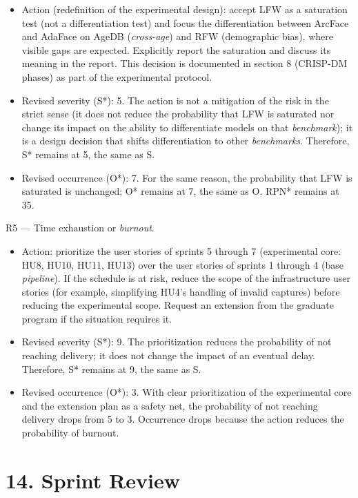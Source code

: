 \documentclass[
  11pt, %
]{charter}
\begin{document}
\begin{itemize}
\item Action (redefinition of the experimental design): accept LFW as a saturation test (not a differentiation test) and focus the differentiation between ArcFace and AdaFace on AgeDB (\textit{cross-age}) and RFW (demographic bias), where visible gaps are expected. Explicitly report the saturation and discuss its meaning in the report. This decision is documented in section 8 (CRISP-DM phases) as part of the experimental protocol.
\item Revised severity (S*): 5. The action is not a mitigation of the risk in the strict sense (it does not reduce the probability that LFW is saturated nor change its impact on the ability to differentiate models on that \textit{benchmark}); it is a design decision that shifts differentiation to other \textit{benchmarks}. Therefore, S* remains at 5, the same as S.
\item Revised occurrence (O*): 7. For the same reason, the probability that LFW is saturated is unchanged; O* remains at 7, the same as O. RPN* remains at 35.
\end{itemize}

R5 --- Time exhaustion or \textit{burnout}.

\begin{itemize}
\item Action: prioritize the user stories of sprints 5 through 7 (experimental core: HU8, HU10, HU11, HU13) over the user stories of sprints 1 through 4 (base \textit{pipeline}). If the schedule is at risk, reduce the scope of the infrastructure user stories (for example, simplifying HU4's handling of invalid captures) before reducing the experimental scope. Request an extension from the graduate program if the situation requires it.
\item Revised severity (S*): 9. The prioritization reduces the probability of not reaching delivery; it does not change the impact of an eventual delay. Therefore, S* remains at 9, the same as S.
\item Revised occurrence (O*): 3. With clear prioritization of the experimental core and the extension plan as a safety net, the probability of not reaching delivery drops from 5 to 3. Occurrence drops because the action reduces the probability of burnout.
\end{itemize}

\section{14. Sprint Review}
\label{sec:sprint_review}
\end{document}
